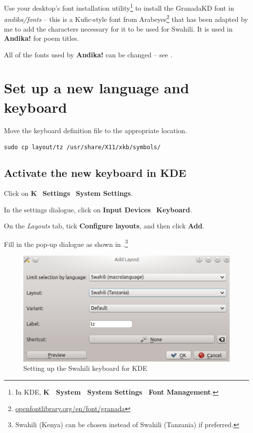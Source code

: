 Use your desktop's font installation utility\footnote{In KDE, \textbf{K \textrightarrow\ System \textrightarrow\ System Settings \textrightarrow\ Font Management}.} to install the GranadaKD font in \textit{andika/fonts} -- this is a Kufic-style font from Arabeyes\footnote{\url{openfontlibrary.org/en/font/granada}} that has been adapted by me to add the characters necessary for it to be used for Swahili.  It is used in \textbf{Andika!} for poem titles.

All of the fonts used by \textbf{Andika!} can be changed -- see .

\section{Set up a new language and keyboard}
\label{s:keyboard}

Move the keyboard definition file to the appropriate location.

\verb|sudo cp layout/tz /usr/share/X11/xkb/symbols/|

\subsection{Activate the new keyboard in KDE}
\label{s:kbactivate}

Click on \textbf{K} \textrightarrow\ \textbf{Settings} \textrightarrow\ \textbf{System Settings}.

In the settings dialogue, click on \textbf{Input Devices} \textrightarrow\ \textbf{Keyboard}.

On the \textit{Layouts} tab, tick \textbf{Configure layouts}, and then click \textbf{Add}.

Fill in the pop-up dialogue as shown in .\footnote{Swahili (Kenya) can be chosen instead of Swahili (Tanzania) if preferred.}

\begin{figure}[h]
\centering
\includegraphics[keepaspectratio=true]{./images/kdelg.png}
\caption{Setting up the Swahili keyboard for KDE}
\label{fig:kdelg}
\end{figure}


